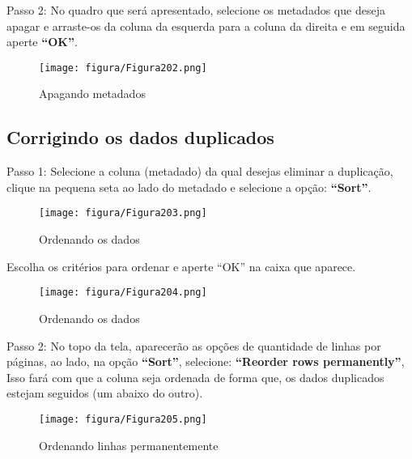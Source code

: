 \documentclass[12pt,hidelinks]{article}
\begin{document}
    Passo 2: No quadro que será apresentado, selecione os metadados que deseja apagar e arraste-os da coluna da esquerda para a coluna da direita e em seguida aperte \textbf{“OK”}.
    
     \begin{figure}[!htp]
                \centering
                \texttt{[image: figura/Figura202.png]}
                \caption{Apagando metadados}
            \label{Rotulo}
        \end{figure}

\newpage
    
    \subsection{Corrigindo os dados duplicados}
    
    Passo 1: Selecione a coluna (metadado) da qual desejas eliminar a duplicação, clique na pequena seta ao lado do metadado e selecione a opção: \textbf{“Sort”}. 
    
    \begin{figure}[!htp]
                \centering
                \texttt{[image: figura/Figura203.png]}
                \caption{Ordenando os dados}
            \label{Rotulo}
        \end{figure}
    
    Escolha os critérios para ordenar e aperte “OK” na caixa que aparece.
    
    \begin{figure}[!htp]
                \centering
                \texttt{[image: figura/Figura204.png]}
                \caption{Ordenando os dados}
            \label{Rotulo}
        \end{figure}
    
\newpage
    
    Passo 2: No topo da tela, aparecerão as opções de quantidade de linhas por páginas, ao lado, na opção \textbf{“Sort”}, selecione: \textbf{“Reorder rows permanently”}, Isso fará com que a coluna seja ordenada de forma que, os dados duplicados estejam seguidos (um abaixo do outro).
    
    \begin{figure}[!htp]
                \centering
                \texttt{[image: figura/Figura205.png]}
                \caption{Ordenando linhas permanentemente}
            \label{Rotulo}
        \end{figure}
    
\end{document}

